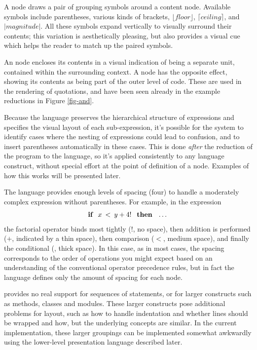 A  node draws a pair of grouping symbols around a content node. Available symbols include parentheses, various kinds of brackets, $\lfloor\mathit{floor}\rfloor$, $\lceil\mathit{ceiling}\rceil$, and $|\mathit{magnitude}|$. All these symbols expand vertically to visually surround their contents; this variation is aesthetically pleasing, but also provides a visual cue which helps the reader to match up the paired symbols.

An  node encloses its contents in a visual indication of being a separate unit, contained within the surrounding context. A  node has the opposite effect, showing its contents as being part of the outer level of code. These are used in the rendering of quotations, and have been seen already in the example reductions in Figure \ref{fig-and}.

Because the  language preserves the hierarchical structure of expressions and specifies the visual layout of each sub-expression, it's possible for the system to identify cases where the nesting of expressions could lead to confusion, and to insert parentheses automatically in these cases. This is done \emph{after} the reduction of the program to the  language, so it's applied consistently to any language construct, without special effort at the point of definition of a node. Examples of how this works will be presented later.

The  language provides enough levels of spacing (four) to handle a moderately complex expression without parentheses. For example, in the expression 
$$\textbf{if} \:\ \: x \: < \: y + 4! \:\ \: \textbf{then} \:\ \: \dots$$
the factorial operator binds most tightly ($!$, no space), then addition is performed ($+$, indicated by a thin space), then comparison ($<$, medium space), and finally the conditional (, thick space). In this case, as in most cases, the spacing corresponds to the order of operations you might expect based on an understanding of the conventional operator precedence rules, but in fact the language defines only the amount of spacing for each node. 


 provides no real support for sequences of statements, or for larger constructs such as methods, classes and modules. These larger constructs pose additional problems for layout, such as how to handle indentation and whether lines should be wrapped and how, but the underlying concepts are similar. In the current implementation, these larger groupings can be implemented somewhat awkwardly using the lower-level presentation language described later.


